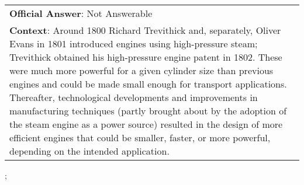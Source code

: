 \begin{figure*}[ht]
{\begin{tabular}{p{}}
            \textbf{Official Answer}: Not Answerable                                                                                                                                                                                                                                                                                                                                                                                                                                                                                                                                                                                                             \\
            \textbf{Context}: Around 1800 Richard Trevithick and, separately, Oliver Evans in 1801 introduced engines using high-pressure steam; Trevithick obtained his high-pressure engine patent in 1802. These were much more powerful for a given cylinder size than previous engines and could be made small enough for transport applications. Thereafter, technological developments and improvements in manufacturing techniques (partly brought about by the adoption of the steam engine as a power source) resulted in the design of more efficient engines that could be smaller, faster, or more powerful, depending on the intended application. \\
        \end{tabular}
    };
    \label{fig:ex-5ad3cab2604f3c001a3ff0e3}
\end{figure*}

